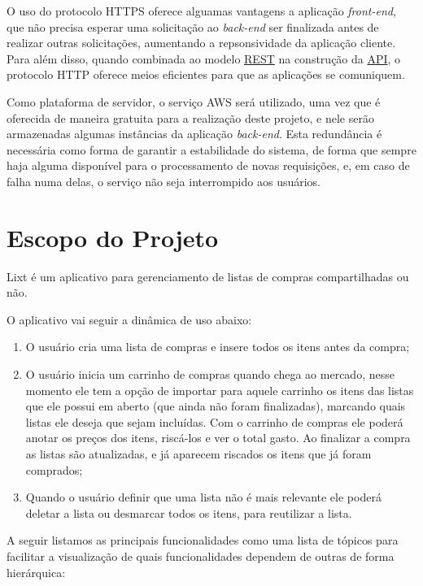 O uso do protocolo HTTPS oferece alguamas vantagens a aplicação
\emph{front-end}, que não precisa esperar uma solicitação ao
\emph{back-end} ser finalizada antes de realizar outras solicitações,
aumentando a repsonsividade da aplicação cliente. Para além disso,
quando combinada ao modelo \label{sig:rest}\hyperlink{s:rest}{REST} na
construção da \label{sig:API} \hyperlink{s:API}{API}, o protocolo HTTP
oferece meios eficientes para que as aplicações se comuniquem.

Como plataforma de servidor, o serviço AWS será utilizado, uma vez que
é oferecida de maneira gratuita para a realização deste projeto, e nele
serão armazenadas algumas instâncias da aplicação \emph{back-end}.
Esta redundância é necessária como forma de garantir a estabilidade do
sistema, de forma que sempre haja alguma disponível para o
processamento de novas requisições, e, em caso de falha numa delas, o
serviço não seja interrompido aos usuários.


\section{Escopo do Projeto}

Lixt é um aplicativo para gerenciamento de listas de compras compartilhadas ou não.

O aplicativo vai seguir a dinâmica de uso abaixo:
\begin{enumerate}
	\item O usuário cria uma lista de compras e insere todos os itens antes da compra;
	\item O usuário inicia um carrinho de compras quando chega ao mercado, nesse momento ele tem a opção de importar para aquele carrinho os itens das listas que ele possui em aberto (que ainda não foram finalizadas), marcando quais listas ele deseja que sejam incluídas. Com o carrinho de compras ele poderá anotar os preços dos itens, riscá-los e ver o total gasto. Ao finalizar a compra as listas são atualizadas, e já aparecem riscados os itens que já foram comprados;
	\item Quando o usuário definir que uma lista não é mais relevante ele poderá deletar a lista ou desmarcar todos os itens, para reutilizar a lista.
\end{enumerate}

A seguir listamos as principais funcionalidades como uma lista de tópicos para facilitar a visualização de quais funcionalidades dependem de outras de forma hierárquica:

